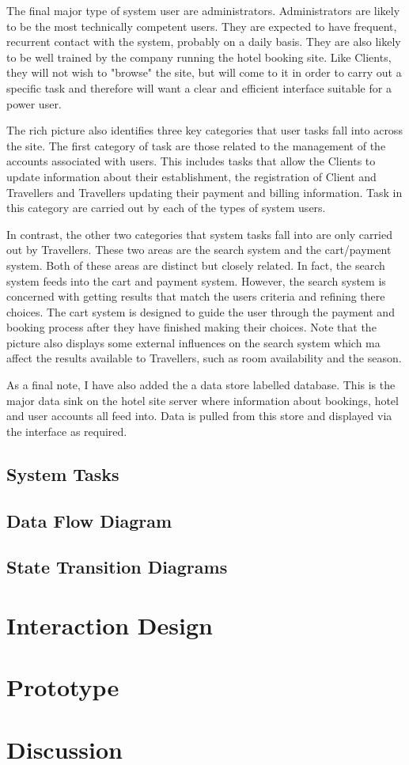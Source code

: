 \documentclass{article}
\begin{document}
The final major type of system user are administrators. Administrators are likely to be the most technically competent users. They are expected to have frequent, recurrent contact with the system, probably on a daily basis. They are also likely to be well trained by the company running the hotel booking site. Like Clients, they will not wish to "browse" the site, but will come to it in order to carry out a specific task and therefore will want a clear and efficient interface suitable for a power user.

The rich picture also identifies three key categories that user tasks fall into across the site. The first category of task are those related to the management of the accounts associated with users. This includes tasks that allow the Clients to update information about their establishment, the registration of Client and Travellers and Travellers updating their payment and billing information. Task in this category are carried out by each of the types of system users.

In contrast, the other two categories that system tasks fall into are only carried out by Travellers. These two areas are the search system and the cart/payment system. Both of these areas are distinct but closely related. In fact, the search system feeds into the cart and payment system. However, the search system is concerned with getting results that match the users criteria and refining there choices. The cart system is designed to guide the user through the payment and booking process after they have finished making their choices. Note that the picture also displays some external influences on the search system which ma affect the results available to Travellers, such as room availability and the season.

As a final note, I have also added the a data store labelled database. This is the major data sink on the hotel site server where information about bookings, hotel and user accounts all feed into. Data is pulled from this store and displayed via the interface as required.

\subsection{System Tasks}

\subsection{Data Flow Diagram}

\subsection{State Transition Diagrams}

\section{Interaction Design}

\section{Prototype}

\section{Discussion}
\end{document}
